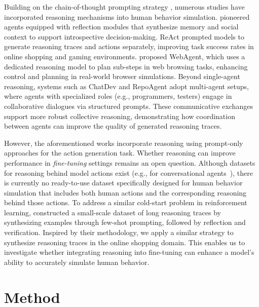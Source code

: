\documentclass{article} %
\begin{document}
Building on the chain-of-thought prompting strategy \cite{weiChainofThoughtPromptingElicits2023}, numerous studies have incorporated reasoning mechanisms into human behavior simulation.  
\citet{parkGenerativeAgentsInteractive2023} pioneered agents equipped with reflection modules that synthesize memory and social context to support introspective decision-making. 
ReAct \cite{yaoReActSynergizingReasoning2023} prompted models to generate reasoning traces and actions separately, improving task success rates in online shopping and gaming environments.  
\citet{gurRealWorldWebAgentPlanning2023} proposed WebAgent, which uses a dedicated reasoning model to plan sub-steps in web browsing tasks, enhancing control and planning in real-world browser simulations.  
Beyond single-agent reasoning, systems such as ChatDev \cite{qianChatDevCommunicativeAgents2024} and RepoAgent \cite{luoRepoAgentLLMPoweredOpenSource2024} adopt multi-agent setups, where agents with specialized roles (e.g., programmers, testers) engage in collaborative dialogues via structured prompts. These communicative exchanges support more robust collective reasoning, demonstrating how coordination between agents can improve the quality of generated reasoning traces.

However, the aforementioned works incorporate reasoning using prompt-only approaches for the action generation task. Whether reasoning can improve performance in \textit{fine-tuning} settings remains an open question.
Although datasets for reasoning behind model actions exist (e.g., for conversational agents~\citep{dongreReSpActHarmonizingReasoning2025}), there is currently no ready-to-use dataset specifically designed for human behavior simulation that includes both human actions and the corresponding reasoning behind those actions.
To address a similar cold-start problem in reinforcement learning, \citet{deepseek-aiDeepSeekR1IncentivizingReasoning2025} constructed a small-scale dataset of long reasoning traces by synthesizing examples through few-shot prompting, followed by reflection and verification. Inspired by their methodology, we apply a similar strategy to synthesize reasoning traces in the online shopping domain. This enables us to investigate whether integrating reasoning into fine-tuning can enhance a model's ability to accurately simulate human behavior.


\section{Method}
\end{document}
